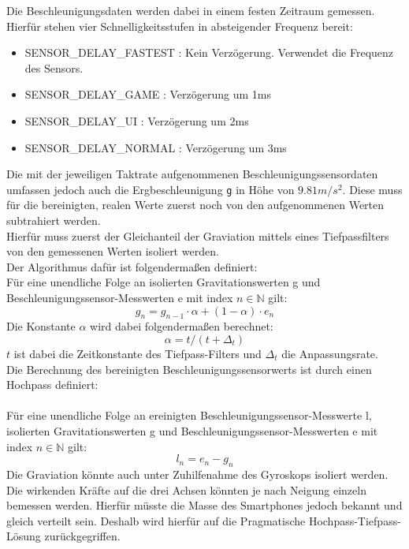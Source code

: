 \documentclass[11pt,a4paper]{report}
\begin{document}
Die Beschleunigungsdaten werden dabei in einem festen Zeitraum gemessen.
Hierfür stehen vier Schnelligkeitsstufen in absteigender Frequenz bereit:
\begin{itemize}
  \item SENSOR\_DELAY\_FASTEST : Kein Verzögerung. Verwendet die Frequenz des Sensors.
  \item SENSOR\_DELAY\_GAME : Verzögerung um 1ms
  \item SENSOR\_DELAY\_UI : Verzögerung um 2ms
  \item SENSOR\_DELAY\_NORMAL : Verzögerung um 3ms
\end{itemize}
Die mit der jeweiligen Taktrate aufgenommenen Beschleunigungssensordaten umfassen jedoch auch die Ergbeschleunigung \texttt{g} in Höhe von $9.81 m/s^2$.
Diese muss für die bereinigten, realen Werte zuerst noch von den aufgenommenen Werten subtrahiert werden.
\\
Hierfür muss zuerst der Gleichanteil der Graviation mittels eines Tiefpassfilters von den gemessenen Werten isoliert werden.
\\
Der Algorithmus dafür ist folgendermaßen definiert:
\\
Für eine unendliche Folge an isolierten Gravitationswerten g und Beschleunigungssensor-Messwerten e mit index $n \in \mathbb{N} $ gilt:
\begin{equation}
  g_n = g_{n-1} \cdot \alpha + (1 - \alpha) \cdot e_n
\end{equation}
Die Konstante $\alpha$ wird dabei folgendermaßen berechnet:
\begin{equation}
  \alpha = t / (t + \Delta_t )
\end{equation}
$t$ ist dabei die Zeitkonstante des Tiefpass-Filters und $\Delta_t$ die Anpassungsrate.
\\
Die Berechnung des bereinigten Beschleunigungssensorwerts ist durch einen Hochpass definiert:
\\\\
Für eine unendliche Folge an ereinigten Beschleunigungssensor-Messwerte l, isolierten Gravitationswerten g und Beschleunigungssensor-Messwerten e  mit index $n \in \mathbb{N}$ gilt:
\begin{equation}
  l_n = e_n - g_n
\end{equation}
Die Graviation könnte auch unter Zuhilfenahme des Gyroskops isoliert werden.
Die wirkenden Kräfte auf die drei Achsen könnten je nach Neigung einzeln bemessen werden.
Hierfür müsste die Masse des Smartphones jedoch bekannt und gleich verteilt sein.
Deshalb wird hierfür auf die Pragmatische Hochpass-Tiefpass-Lösung zurückgegriffen.
\end{document}
